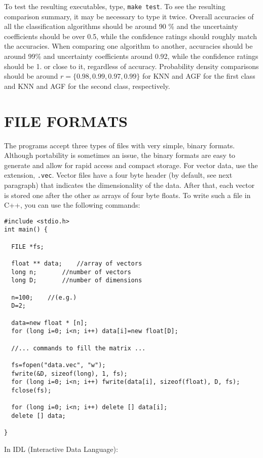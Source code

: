 \documentclass[12pt]{article}
\begin{document}
  To test the resulting executables, type, \verb"make test".  To see the resulting comparison summary, it may be necessary to type it twice.  Overall accuracies of all the classification algorithms should be around 90 \% and the uncertainty coefficients should be over 0.5, while the confidence ratings should roughly match the accuracies.  When comparing one algorithm to another, accuracies should be around 99\% and uncertainty coefficients around 0.92, while the confidence ratings should be 1. or close to it, regardless of accuracy.  Probability density comparisons should be around $r=\lbrace 0.98, 0.99, 0.97, 0.99 \rbrace$ for KNN and AGF for the first class and KNN and AGF for the second class, respectively.

\section{FILE FORMATS}

  The programs accept three types of files with very simple, binary formats.  Although portability is sometimes an issue, the binary formats are easy to generate and allow for rapid access and compact storage.  For vector data, use the extension, \verb".vec".  Vector files have a four byte header (by default, see next paragraph) that indicates the dimensionality of the data.  After that, each vector is stored one after the other as arrays of four byte floats.  To write such a file in C++, you can use the following commands:

\begin{verbatim}
#include <stdio.h>
int main() {

  FILE *fs;

  float ** data;	//array of vectors
  long n;		//number of vectors
  long D;		//number of dimensions

  n=100;	//(e.g.)
  D=2;

  data=new float * [n];
  for (long i=0; i<n; i++) data[i]=new float[D];

  //... commands to fill the matrix ...

  fs=fopen("data.vec", "w");
  fwrite(&D, sizeof(long), 1, fs);
  for (long i=0; i<n; i++) fwrite(data[i], sizeof(float), D, fs);
  fclose(fs);
  
  for (long i=0; i<n; i++) delete [] data[i];
  delete [] data;

}
\end{verbatim}

In IDL (Interactive Data Language):
\end{document}
